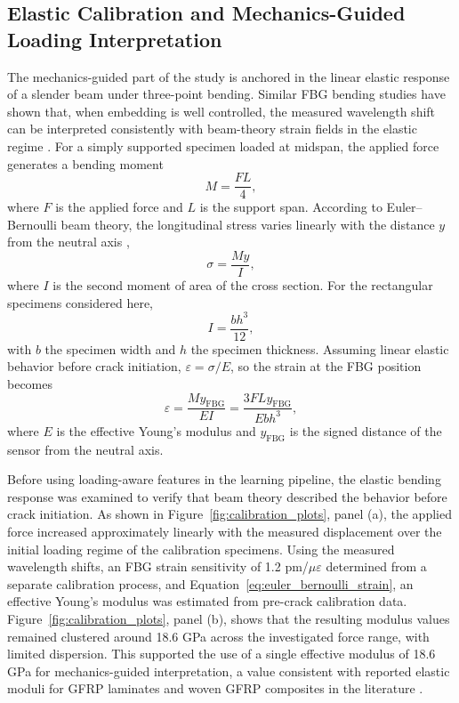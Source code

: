 \documentclass[notspecified,article,submit,pdftex,moreauthors]{Definitions/mdpi}
\begin{document}
\subsection{Elastic Calibration and Mechanics-Guided Loading Interpretation}

The mechanics-guided part of the study is anchored in the linear elastic response of a slender beam under three-point bending. Similar FBG bending studies have shown that, when embedding is well controlled, the measured wavelength shift can be interpreted consistently with beam-theory strain fields in the elastic regime \cite{gabardi2023}. For a simply supported specimen loaded at midspan, the applied force generates a bending moment
\begin{equation}
M = \frac{F L}{4},
\end{equation}
where $F$ is the applied force and $L$ is the support span. According to Euler--Bernoulli beam theory, the longitudinal stress varies linearly with the distance $y$ from the neutral axis \cite{ochsner2021},
\begin{equation}
\sigma = \frac{M y}{I},
\end{equation}
where $I$ is the second moment of area of the cross section. For the rectangular specimens considered here,
\begin{equation}
I = \frac{b h^3}{12},
\end{equation}
with $b$ the specimen width and $h$ the specimen thickness. Assuming linear elastic behavior before crack initiation, $\varepsilon = \sigma / E$, so the strain at the FBG position becomes
\begin{equation}
\varepsilon = \frac{M y_{\mathrm{FBG}}}{E I} = \frac{3 F L y_{\mathrm{FBG}}}{E b h^3},
\label{eq:euler_bernoulli_strain}
\end{equation}
where $E$ is the effective Young's modulus and $y_{\mathrm{FBG}}$ is the signed distance of the sensor from the neutral axis.

Before using loading-aware features in the learning pipeline, the elastic bending response was examined to verify that beam theory described the behavior before crack initiation. As shown in Figure~\ref{fig:calibration_plots}, panel (a), the applied force increased approximately linearly with the measured displacement over the initial loading regime of the calibration specimens. Using the measured wavelength shifts, an FBG strain sensitivity of 1.2 pm/$\mu\varepsilon$ determined from a separate calibration process, and Equation~\ref{eq:euler_bernoulli_strain}, an effective Young's modulus was estimated from pre-crack calibration data. Figure~\ref{fig:calibration_plots}, panel (b), shows that the resulting modulus values remained clustered around 18.6 GPa across the investigated force range, with limited dispersion. This supported the use of a single effective modulus of 18.6 GPa for mechanics-guided interpretation, a value consistent with reported elastic moduli for GFRP laminates and woven GFRP composites in the literature \cite{bazli2019,gao2016}.
\end{document}
